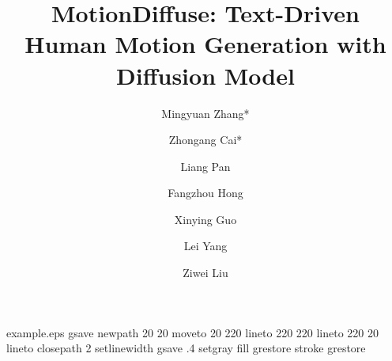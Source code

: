 \begin{filecontents*}{example.eps}
gsave
newpath
  20 20 moveto
  20 220 lineto
  220 220 lineto
  220 20 lineto
closepath
2 setlinewidth
gsave
  .4 setgray fill
grestore
stroke
grestore
\end{filecontents*}
\RequirePackage{fix-cm}
\documentclass[twocolumn]{svjour3}          \smartqed  \usepackage{graphicx}
\usepackage{natbib}
\usepackage{multirow}
\usepackage{amsmath}
\usepackage{amssymb}
\usepackage{bbm}
\usepackage{bm}
\usepackage{booktabs}
\usepackage{array} \usepackage{blindtext}
\usepackage{comment}

\newcommand{\tableCellHeight}{1.1}
\newcommand{\tabstyle}[1]{
  \setlength{\tabcolsep}{#1}
  \renewcommand{\arraystretch}{\tableCellHeight}
  \centering
  \footnotesize
}



\usepackage{pifont}
\newcommand{\cmark}{\ding{51}}
\newcommand{\xmark}{\ding{55}}

\newcommand{\romannum}[1]{\romannumeral #1} 


\usepackage{xspace}
\newcommand{\name}{MotionDiffuse\xspace}
\newcommand{\eg}{\textit{e.g.}\xspace}
\newcommand{\ie}{\textit{i.e.}\xspace}
\newcommand{\etal}{\textit{et al.}\xspace}

\usepackage[dvipsnames]{xcolor}
\usepackage{color, colortbl}
\usepackage[colorlinks,citecolor=citecolor]{hyperref}
\newcommand{\hgreen}[1]{\textcolor{ForestGreen}{\textbf{#1}}} \newcommand{\hblue}[1]{\textcolor{NavyBlue}{\textbf{#1}}} \newcommand{\hred}[1]{\textcolor{WildStrawberry}{\textbf{#1}}} 

\newcommand\pl[1]{{\color{violet}#1}}
\newcommand\zhongang[1]{{\color{blue}#1}}

\makeatletter
\renewcommand\paragraph{
  \@startsection{paragraph} {4} {\z@} {.5em \@plus1ex \@minus.2ex} {-.5em} {\normalfont\normalsize\bfseries} }
\makeatother

\sloppy

\title{MotionDiffuse: Text-Driven Human Motion Generation with Diffusion Model}



\author{Mingyuan Zhang* \and
        Zhongang Cai* \and
        Liang Pan \and
        Fangzhou Hong \and
        Xinying Guo \and
        Lei Yang \and
        Ziwei Liu
}


